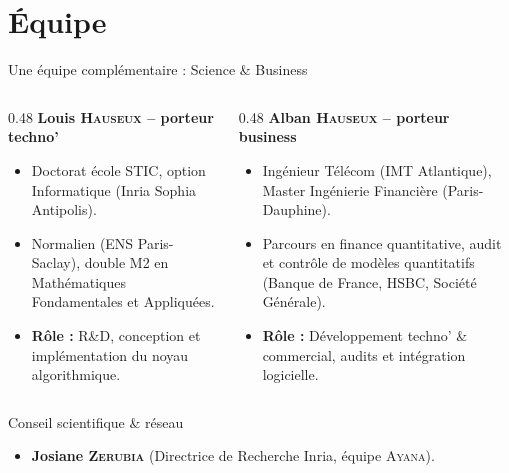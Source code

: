 \documentclass[A4,svgnames,9pt,aspectratio=169]{beamer}
\begin{document}
\section{Équipe}
\begin{frame}{Une équipe complémentaire : Science \& Business}
    \begin{columns}[T]
        \begin{column}{0.48\textwidth}
            \textbf{\bleu Louis \textsc{Hauseux} -- porteur techno'}
            \begin{itemize}
                \item Doctorat école STIC, option Informatique (Inria Sophia Antipolis).
                \item Normalien (ENS Paris-Saclay), double M2 en Mathématiques Fondamentales et Appliquées.
                \item \textbf{Rôle :} R\&D, conception et implémentation du noyau algorithmique.
            \end{itemize}
        \end{column}
        
        \begin{column}{0.48\textwidth}
            \textbf{\bleu Alban \textsc{Hauseux} -- porteur business}
            \begin{itemize}
                \item Ingénieur Télécom (IMT Atlantique), Master Ingénierie Financière (Paris-Dauphine).
                \item Parcours en finance quantitative, audit et contrôle de modèles quantitatifs (Banque de France, HSBC, Société Générale).
                \item \textbf{Rôle :} Développement techno' \& commercial, audits et intégration logicielle.
            \end{itemize}
        \end{column}
    \end{columns}
    
    \begin{block}{\large Conseil scientifique \& réseau}
        \begin{itemize}
            \item \textbf{Josiane \textsc{Zerubia}} (Directrice de Recherche Inria, équipe \textsc{Ayana}).
        \end{itemize}
    \end{block}
\end{frame}
\end{document}
